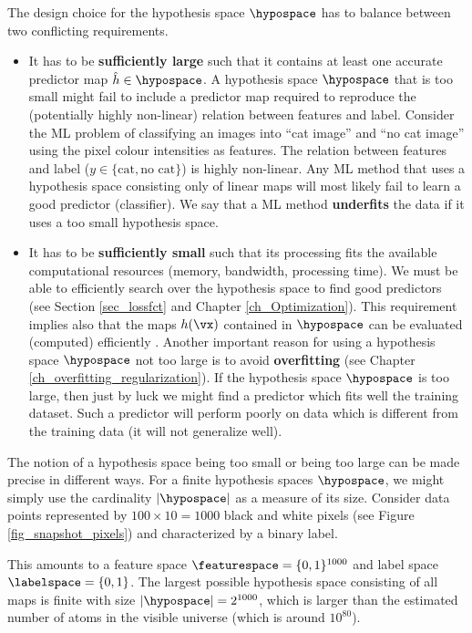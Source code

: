\documentclass[12pt]{report}
\begin{document}
The design choice for the hypothesis space $\hypospace$ 
has to balance between two conflicting requirements.  
\begin{itemize} 
\item It has to be {\bf sufficiently large} such that it contains at least 
one accurate predictor map $\hat{h} \in \hypospace$. A hypothesis space $\hypospace$ 
that is too small might fail to include a predictor map required to reproduce the (potentially 
highly non-linear) relation between features and label. Consider the ML problem of classifying 
an images into ``cat image'' and ``no cat image'' using the pixel colour intensities as features. 
The relation between features and label ($y \in \{ \mbox{cat}, \mbox{no cat} \}$) is highly non-linear. 
Any ML method that uses a hypothesis space consisting only of linear maps will most likely 
fail to learn a good predictor (classifier). We say that a ML method {\bf underfits} the data if it 
uses a too small hypothesis space. 
\item It has to be {\bf sufficiently small} such that its processing fits the 
available computational resources (memory, bandwidth, processing time). 
We must be able to efficiently search over the hypothesis space to find 
good predictors (see Section \ref{sec_lossfct} and Chapter \ref{ch_Optimization}). 
This requirement implies also that the maps $h(\vx)$ contained in $\hypospace$ 
can be evaluated (computed) efficiently \cite{Austin2018}. Another important 
reason for using a hypothesis space $\hypospace$ not too large is to 
avoid {\bf overfitting} (see Chapter \ref{ch_overfitting_regularization}). 
If the hypothesis space $\hypospace$ is too large, then just by luck we 
might find a predictor which fits well the training dataset. Such a predictor 
will perform poorly on data which is different from the training data 
(it will not generalize well). 
\end{itemize}

The notion of a hypothesis space being too small or being too large can 
be made precise in different ways. For a finite hypothesis spaces $\hypospace$, 
we might simply use the cardinality $|\hypospace|$ as a measure of its size. 
Consider data points represented by $100 \times 10 = 1000$ black and white 
pixels (see Figure \ref{fig_snapshot_pixels}) and characterized by a binary label. 

This amounts to a feature space $\featurespace = \{0,1\}^{1000}$ and label space 
$\labelspace = \{0,1\}$. The largest possible hypothesis space consisting of 
all maps is finite with size $|\hypospace| = 2^{1000}$, which is larger than 
the estimated number of atoms in the visible universe (which is around $10^{80}$). 
\end{document}
